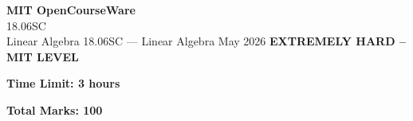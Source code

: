 \documentclass[12pt,a4paper]{exam}
\begin{document}
\begin{center}
{\LARGE \textbf{MIT OpenCourseWare}}\\18.06SC\\Linear Algebra
\vspace{0.5cm}
{18.06SC} --- {Linear Algebra}
\vspace{0.3cm}
May 2026
\vspace{0.3cm}
\textbf{EXTREMELY HARD -- MIT LEVEL}
\end{center}

\begin{center}
\textbf{Time Limit: 3 hours}
\end{center}

\begin{center}
\textbf{Total Marks: 100}
\end{center}

\vspace{0.5cm}
\end{document}
